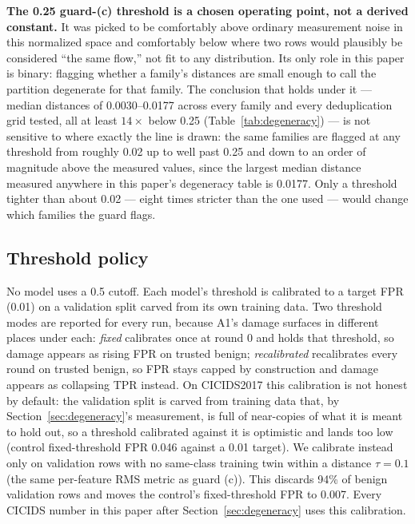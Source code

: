 \textbf{The 0.25 guard-(c) threshold is a chosen operating point, not a derived constant.} It was
picked to be comfortably above ordinary measurement noise in this normalized space and
comfortably below where two rows would plausibly be considered “the same flow,” not fit to any
distribution. Its only role in this paper is binary: flagging whether a family's distances are
small enough to call the partition degenerate for that family. The conclusion that holds under
it — median distances of 0.0030--0.0177 across every family and every deduplication grid tested,
all at least $14\times$ below 0.25 (Table~\ref{tab:degeneracy}) — is not sensitive to where
exactly the line is drawn: the same families are flagged at any threshold from roughly 0.02 up to
well past 0.25 and down to an order of magnitude above the measured values, since the largest
median distance measured anywhere in this paper's degeneracy table is 0.0177. Only a threshold
tighter than about 0.02 — eight times stricter than the one used — would change which families
the guard flags.

\subsection{Threshold policy}
No model uses a 0.5 cutoff. Each model's threshold is calibrated to a target FPR (0.01) on a
validation split carved from its own training data. Two threshold modes are reported for every
run, because A1's damage surfaces in different places under each: \emph{fixed} calibrates once
at round 0 and holds that threshold, so damage appears as rising FPR on trusted benign;
\emph{recalibrated} recalibrates every round on trusted benign, so FPR stays capped by
construction and damage appears as collapsing TPR instead.
On CICIDS2017 this calibration is not honest by default: the validation split is carved from
training data that, by Section~\ref{sec:degeneracy}'s measurement, is full of near-copies of
what it is meant to hold out, so a threshold calibrated against it is optimistic and lands too
low (control fixed-threshold FPR 0.046 against a 0.01 target). We calibrate instead only on
validation rows with no same-class training twin within a distance $\tau=0.1$ (the same
per-feature RMS metric as guard (c)). This discards 94\% of benign validation rows and moves
the control's fixed-threshold FPR to 0.007. Every CICIDS number in this paper after
Section~\ref{sec:degeneracy} uses this calibration.

